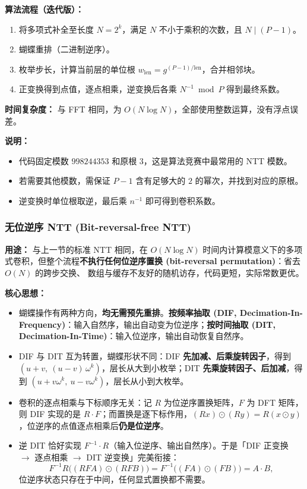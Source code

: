 \vspace{0.3cm}

\textbf{算法流程（迭代版）：}
\begin{enumerate}
    \item 将多项式补全至长度 $N=2^k$，满足 $N$ 不小于乘积的次数，且 $N \mid (P-1)$。
    \item 蝴蝶重排（二进制逆序）。
    \item 枚举步长，计算当前层的单位根 $w_{\text{len}}=g^{(P-1)/\text{len}}$，合并相邻块。
    \item 正变换得到点值，逐点相乘，逆变换后各乘 $N^{-1}\bmod P$ 得到最终系数。
\end{enumerate}

\textbf{时间复杂度：} 与 FFT 相同，为 $O(N\log N)$，全部使用整数运算，没有浮点误差。



\textbf{说明：}
\begin{itemize}
    \item 代码固定模数 $998244353$ 和原根 $3$，这是算法竞赛中最常用的 NTT 模数。
    \item 若需要其他模数，需保证 $P-1$ 含有足够大的 $2$ 的幂次，并找到对应的原根。
    \item 逆变换时单位根取逆，最后乘 $n^{-1}$ 即可得到卷积系数。
\end{itemize}

\subsubsection{无位逆序 NTT (Bit-reversal-free NTT)}

\textbf{用途：}
与上一节的标准 NTT 相同，在 $O(N\log N)$ 时间内计算模意义下的多项式卷积，但整个流程\textbf{不执行任何位逆序置换 (bit-reversal permutation)}：省去 $O(N)$ 的跨步交换、 数组与缓存不友好的随机访存，代码更短，实际常数更优。

\textbf{核心思想：}
\begin{itemize}
    \item 蝴蝶操作有两种方向，\textbf{均无需预先重排}。\textbf{按频率抽取 (DIF, Decimation-In-Frequency)}：输入自然序，输出自动变为位逆序；\textbf{按时间抽取 (DIT, Decimation-In-Time)}：输入位逆序，输出自动恢复自然序。
    \item DIF 与 DIT 互为转置，蝴蝶形状不同：DIF \textbf{先加减、后乘旋转因子}，得到 $(u+v,\ (u-v)\,\omega^{k})$，层长从大到小枚举；DIT \textbf{先乘旋转因子、后加减}，得到 $(u+v\omega^{k},\ u-v\omega^{k})$，层长从小到大枚举。
    \item 卷积的逐点相乘与下标顺序无关：记 $R$ 为位逆序置换矩阵，$F$ 为 DFT 矩阵，则 DIF 实现的是 $R\cdot F$；而置换是逐下标作用，$(Rx)\odot(Ry)=R(x\odot y)$，位逆序的点值逐点相乘后\textbf{仍是位逆序}。
    \item 逆 DIT 恰好实现 $F^{-1}\cdot R$（输入位逆序、输出自然序）。于是「DIF 正变换 $\to$ 逐点相乘 $\to$ DIT 逆变换」完美衔接：\[F^{-1}R\big((RFA)\odot(RFB)\big)=F^{-1}\big((FA)\odot(FB)\big)=A\cdot B,\] 位逆序状态只存在于中间，任何显式置换都不需要。
\end{itemize}

